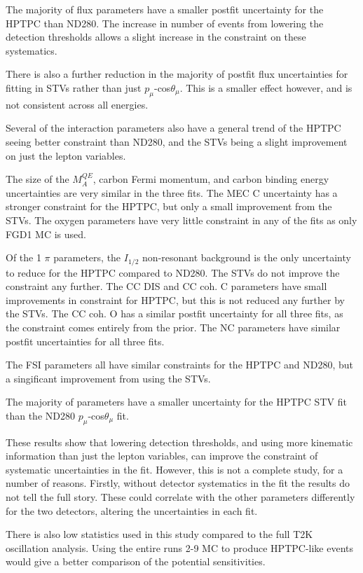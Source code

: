 The majority of flux parameters have a smaller postfit uncertainty for the HPTPC than ND280. The increase in number of events from lowering the detection thresholds allows a slight increase in the constraint on these systematics.

There is also a further reduction in the majority of postfit flux uncertainties for fitting in STVs rather than just $p_{\mu}$-cos$\theta_{\mu}$. This is a smaller effect however, and is not consistent across all energies.

Several of the interaction parameters also have a general trend of the HPTPC seeing better constraint than ND280, and the STVs being a slight improvement on just the lepton variables.

The size of the $M_{A}^{QE}$, carbon Fermi momentum, and carbon binding energy uncertainties are very similar in the three fits. The MEC C uncertainty has a stronger constraint for the HPTPC, but only a small improvement from the STVs. The oxygen parameters have very little constraint in any of the fits as only FGD1 MC is used. 

Of the 1 $\pi$ parameters, the $I_{1/2}$ non-resonant background is the only uncertainty to reduce for the HPTPC compared to ND280. The STVs do not improve the constraint any further. The CC DIS and CC coh. C parameters have small improvements in constraint for HPTPC, but this is not reduced any further by the STVs. The CC coh. O has a similar postfit uncertainty for all three fits, as the constraint comes entirely from the prior. The NC parameters have similar postfit uncertainties for all three fits.

The FSI parameters all have similar constraints for the HPTPC and ND280, but a singificant improvement from using the STVs.

The majority of parameters have a smaller uncertainty for the HPTPC STV fit than the ND280 $p_{\mu}$-cos$\theta_{\mu}$ fit.

These results show that lowering detection thresholds, and using more kinematic information than just the lepton variables, can improve the constraint of systematic uncertainties in the fit. However, this is not a complete study, for a number of reasons. Firstly, without detector systematics in the fit the results do not tell the full story. These could correlate with the other parameters differently for the two detectors, altering the uncertainties in each fit.

There is also low statistics used in this study compared to the full T2K oscillation analysis. Using the entire runs 2-9 MC to produce HPTPC-like events would give a better comparison of the potential sensitivities.

